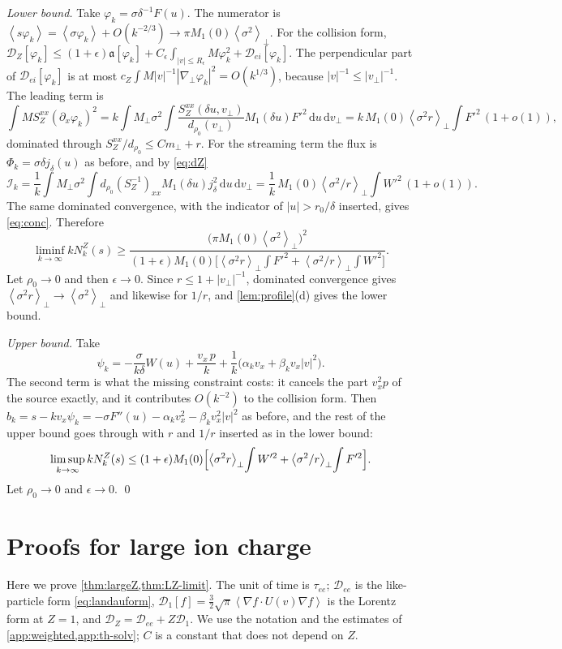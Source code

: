 \documentclass[11pt]{article}
\newcommand{\dd}{\,\mathrm d}
\newcommand{\av}[1]{\left\langle #1\right\rangle}
\newcommand{\D}{\mathcal D}
\theoremstyle{definition}
\theoremstyle{remark}
\numberwithin{equation}{section}
\begin{document}
\emph{Lower bound.} Take $\varphi_k=\sigma\delta^{-1}F(u)$. The numerator
is $\av{s\varphi_k}=\av{\sigma\varphi_k}+O(k^{-2/3})\to\pi M_1(0)\av{\sigma^2}_\perp$.
For the collision form,
$\D_Z[\varphi_k]\leq(1+\epsilon)\mathfrak a[\varphi_k]
+C_\epsilon\!\int_{|v|\leq R_\epsilon}\!M\varphi_k^2+\D_{ei}[\varphi_k]$. The
perpendicular part of $\D_{ei}[\varphi_k]$ is at most
$c_Z\int M|v|^{-1}|\nabla_\perp\varphi_k|^2=O(k^{1/3})$, because
$|v|^{-1}\leq|v_\perp|^{-1}$. The leading term is
\[
 \int MS_Z^{xx}(\partial_x\varphi_k)^2
 =k\int M_\perp\sigma^2\!\int\frac{S_Z^{xx}(\delta u,v_\perp)}{d_{\rho_0}(v_\perp)}
   M_1(\delta u)F'^2\dd u\dd v_\perp
 =k\,M_1(0)\av{\sigma^2r}_\perp\!\int F'^2\,(1+o(1)),
\]
dominated through $S_Z^{xx}/d_{\rho_0}\leq Cm_\perp+r$. For the streaming
term the flux is $\Phi_k=\sigma\delta j_\delta(u)$ as before, and by
\eqref{eq:dZ}
\[
 \mathcal I_k=\frac1k\int M_\perp\sigma^2\!\int d_{\rho_0}(S_Z^{-1})_{xx}
   M_1(\delta u)j_\delta^2\dd u\dd v_\perp
 =\frac1k\,M_1(0)\av{\sigma^2/r}_\perp\!\int W'^2\,(1+o(1)).
\]
The same dominated convergence, with the indicator of $|u|>r_0/\delta$
inserted, gives \eqref{eq:conc}. Therefore
\[
 \liminf_{k\to\infty}kN_k^Z(s)\geq
 \frac{\bigl(\pi M_1(0)\av{\sigma^2}_\perp\bigr)^2}
 {(1+\epsilon)M_1(0)\bigl[\av{\sigma^2r}_\perp\int F'^2
     +\av{\sigma^2/r}_\perp\int W'^2\bigr]} .
\]
Let $\rho_0\to0$ and then $\epsilon\to0$. Since $r\leq1+|v_\perp|^{-1}$,
dominated convergence gives $\av{\sigma^2r}_\perp\to\av{\sigma^2}_\perp$ and
likewise for $1/r$, and \cref{lem:profile}(d) gives the lower bound.

\emph{Upper bound.} Take
\[
 \psi_k=-\frac{\sigma}{k\delta}W(u)+\frac{v_x\,p}{k}
   +\frac1k\bigl(\alpha_kv_x+\beta_kv_x|v|^2\bigr).
\]
The second term is what the missing constraint costs: it cancels the part
$v_x^2p$ of the source exactly, and it contributes $O(k^{-2})$ to the
collision form. Then $b_k=s-kv_x\psi_k=-\sigma F''(u)-\alpha_kv_x^2
-\beta_kv_x^2|v|^2$ as before, and the rest of the upper bound goes through
with $r$ and $1/r$ inserted as in the lower bound:
\[
 \limsup_{k\to\infty}kN_k^Z(s)\leq(1+\epsilon)M_1(0)
 \Bigl[\av{\sigma^2r}_\perp\!\int W'^2+\av{\sigma^2/r}_\perp\!\int F'^2\Bigr].
\]
Let $\rho_0\to0$ and $\epsilon\to0$. \qed

\section{Proofs for large ion charge}\label{app:largeZ}

Here we prove \cref{thm:largeZ,thm:LZ-limit}. The unit of time is
$\tau_{ee}$; $\D_{ee}$ is the like-particle form \eqref{eq:landauform},
$\D_1[f]=\tfrac32\sqrt\pi\av{\nabla f\cdot U(v)\nabla f}$ is the Lorentz
form at $Z=1$, and $\D_Z=\D_{ee}+Z\D_1$. We use the notation and the
estimates of \cref{app:weighted,app:th-solv}; $C$ is a constant that does
not depend on $Z$.
\end{document}
